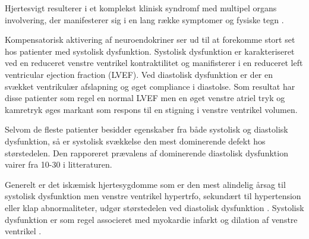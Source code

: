 Hjertesvigt resulterer i et komplekst klinisk syndromf med multipel organs involvering, der manifesterer sig i en lang række symptomer og fysiske tegn \citep{Mcalister1997}.

Kompensatorisk aktivering af neuroendokriner ser ud til at forekomme stort set hos patienter med systolisk dysfunktion. Systolisk dysfunktion er karakteriseret ved en reduceret venstre ventrikel kontraktilitet og manifisterer i en reduceret left ventricular ejection fraction (LVEF). Ved diastolisk dysfunktion er der en svækket ventrikulær afslapning og øget compliance i diastolse. Som resultat har disse patienter som regel en normal LVEF men en øget venstre atriel tryk og kamretryk øges markant som respons til en stigning i venstre ventrikel volumen. \citep{Mcalister1997}

Selvom de fleste patienter besidder egenskaber fra både systolisk og diastolisk dysfunktion, så er systolisk svækkelse den mest dominerende defekt hos størstedelen. Den rapporeret prævalens af dominerende diastolisk dysfunktion vairer fra 10-30 i litteraturen. \citep{Goldsmith1993} 

Generelt er det iskæmisk hjertesygdomme som er den mest alindelig årsag til systolisk dysfunktion men venstre ventrikel hypertrfo, sekundært til hypertension eller klap abnormaliteter, udgør størstedelen ved diastolisk dysfunktion \citep{Mcalister1997}.  
Systolisk dysfunktion er som regel associeret med myokardie infarkt og dilation af venstre ventrikel \citep{Mcalister1997}. 

